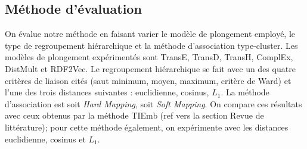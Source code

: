 




\subsection{Méthode d'évaluation}
\label{subsec:te-evaluation}

On évalue notre méthode en faisant varier le modèle de plongement employé, le type de regroupement hiérarchique et la méthode d'association type-cluster. Les modèles de plongement expérimentés sont TransE, TransD, TransH, ComplEx, DistMult et RDF2Vec. Le regroupement hiérarchique se fait avec un des quatre critères de liaison cités (saut minimum, moyen, maximum, critère de Ward) et l'une des trois distances suivantes : euclidienne, cosinus, $L_1$. %
La méthode d'association est soit \textit{Hard Mapping}, soit \textit{Soft Mapping}. On compare ces résultats avec ceux obtenus par la méthode TIEmb (ref vers la section Revue de littérature); pour cette méthode également, on expérimente avec les distances euclidienne, cosinus et $L_1$. 

